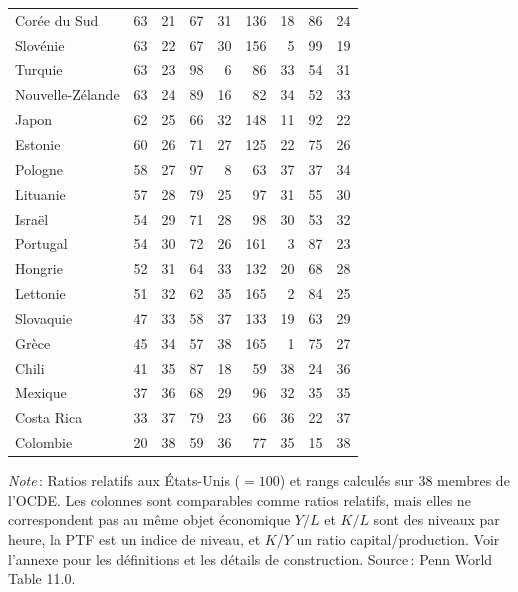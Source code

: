 \begin{table}[p]
\begin{threeparttable}
\begin{tabular}{l *{4}{rr}}
Corée du Sud & 63 & 21 & 67 & 31 & 136 & 18 & 86 & 24 \\
Slovénie & 63 & 22 & 67 & 30 & 156 & 5 & 99 & 19 \\
Turquie & 63 & 23 & 98 & 6 & 86 & 33 & 54 & 31 \\
Nouvelle-Zélande & 63 & 24 & 89 & 16 & 82 & 34 & 52 & 33 \\
Japon & 62 & 25 & 66 & 32 & 148 & 11 & 92 & 22 \\
Estonie & 60 & 26 & 71 & 27 & 125 & 22 & 75 & 26 \\
Pologne & 58 & 27 & 97 & 8 & 63 & 37 & 37 & 34 \\
Lituanie & 57 & 28 & 79 & 25 & 97 & 31 & 55 & 30 \\
Israël & 54 & 29 & 71 & 28 & 98 & 30 & 53 & 32 \\
Portugal & 54 & 30 & 72 & 26 & 161 & 3 & 87 & 23 \\
Hongrie & 52 & 31 & 64 & 33 & 132 & 20 & 68 & 28 \\
Lettonie & 51 & 32 & 62 & 35 & 165 & 2 & 84 & 25 \\
Slovaquie & 47 & 33 & 58 & 37 & 133 & 19 & 63 & 29 \\
Grèce & 45 & 34 & 57 & 38 & 165 & 1 & 75 & 27 \\
Chili & 41 & 35 & 87 & 18 & 59 & 38 & 24 & 36 \\
Mexique & 37 & 36 & 68 & 29 & 96 & 32 & 35 & 35 \\
Costa Rica & 33 & 37 & 79 & 23 & 66 & 36 & 22 & 37 \\
Colombie & 20 & 38 & 59 & 36 & 77 & 35 & 15 & 38 \\
\bottomrule
\end{tabular}
\begin{tablenotes}\footnotesize
\item \textit{Note}\,: Ratios relatifs aux États-Unis ($=100$) et rangs calculés sur 38 membres de l'OCDE. Les colonnes sont comparables comme ratios relatifs, mais elles ne correspondent pas au même objet économique\: $Y/L$ et $K/L$ sont des niveaux par heure, la PTF est un indice de niveau, et $K/Y$ un ratio capital/production. Voir l'annexe pour les définitions et les détails de construction. Source\,: Penn World Table 11.0.
\end{tablenotes}
\end{threeparttable}
\end{table}